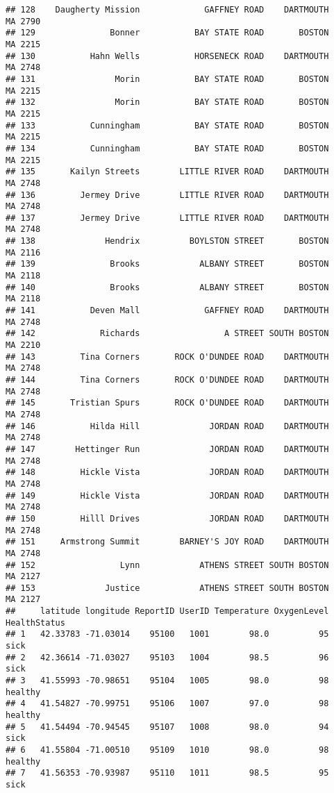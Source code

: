 \documentclass[
]{article}
\begin{document}
\begin{verbatim}
## 128    Daugherty Mission             GAFFNEY ROAD    DARTMOUTH    MA 2790
## 129               Bonner           BAY STATE ROAD       BOSTON    MA 2215
## 130           Hahn Wells           HORSENECK ROAD    DARTMOUTH    MA 2748
## 131                Morin           BAY STATE ROAD       BOSTON    MA 2215
## 132                Morin           BAY STATE ROAD       BOSTON    MA 2215
## 133           Cunningham           BAY STATE ROAD       BOSTON    MA 2215
## 134           Cunningham           BAY STATE ROAD       BOSTON    MA 2215
## 135       Kailyn Streets        LITTLE RIVER ROAD    DARTMOUTH    MA 2748
## 136         Jermey Drive        LITTLE RIVER ROAD    DARTMOUTH    MA 2748
## 137         Jermey Drive        LITTLE RIVER ROAD    DARTMOUTH    MA 2748
## 138              Hendrix          BOYLSTON STREET       BOSTON    MA 2116
## 139               Brooks            ALBANY STREET       BOSTON    MA 2118
## 140               Brooks            ALBANY STREET       BOSTON    MA 2118
## 141           Deven Mall             GAFFNEY ROAD    DARTMOUTH    MA 2748
## 142             Richards                 A STREET SOUTH BOSTON    MA 2210
## 143         Tina Corners       ROCK O'DUNDEE ROAD    DARTMOUTH    MA 2748
## 144         Tina Corners       ROCK O'DUNDEE ROAD    DARTMOUTH    MA 2748
## 145       Tristian Spurs       ROCK O'DUNDEE ROAD    DARTMOUTH    MA 2748
## 146           Hilda Hill              JORDAN ROAD    DARTMOUTH    MA 2748
## 147        Hettinger Run              JORDAN ROAD    DARTMOUTH    MA 2748
## 148         Hickle Vista              JORDAN ROAD    DARTMOUTH    MA 2748
## 149         Hickle Vista              JORDAN ROAD    DARTMOUTH    MA 2748
## 150         Hilll Drives              JORDAN ROAD    DARTMOUTH    MA 2748
## 151     Armstrong Summit        BARNEY'S JOY ROAD    DARTMOUTH    MA 2748
## 152                 Lynn            ATHENS STREET SOUTH BOSTON    MA 2127
## 153              Justice            ATHENS STREET SOUTH BOSTON    MA 2127
##     latitude longitude ReportID UserID Temperature OxygenLevel HealthStatus
## 1   42.33783 -71.03014    95100   1001        98.0          95         sick
## 2   42.36614 -71.03027    95103   1004        98.5          96         sick
## 3   41.55993 -70.98651    95104   1005        98.0          98      healthy
## 4   41.54827 -70.99751    95106   1007        97.0          98      healthy
## 5   41.54494 -70.94545    95107   1008        98.0          94         sick
## 6   41.55804 -71.00510    95109   1010        98.0          98      healthy
## 7   41.56353 -70.93987    95110   1011        98.5          95         sick

\end{verbatim}
\end{document}

